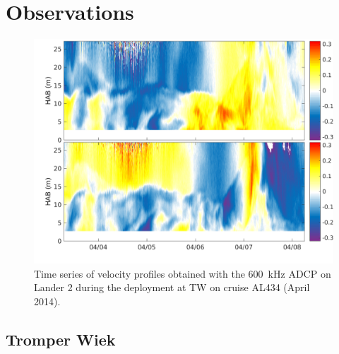 \section{Observations}

 \begin{figure}[ht]
\includegraphics[width=40pc]{bilder/adcp600.png}
 \caption{Time series of velocity profiles obtained with the 600~kHz ADCP on 
Lander 2 during the deployment at TW on cruise AL434 (April 2014).}
 \label{adcp600}
 \end{figure}

\subsection{Tromper Wiek}

